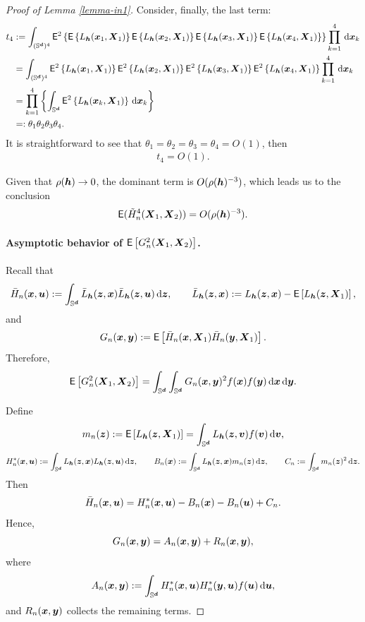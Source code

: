\documentclass[oneside,11pt]{article}
\begin{document}
\begin{proof}[Proof of Lemma \ref{lemma-in1}]
Consider, finally, the last term:
\begin{align*}
    t_4 &\defin \int_{(\Sr)^4} \mathsf{E}^2 \lrb{ \mathsf{E} \lrb{ L_{\bh} (\bx_1,\bX_1)} \mathsf{E} \lrb{ L_{\bh} (\bx_2,\bX_1)} \mathsf{E} \lrb{ L_{\bh} (\bx_3,\bX_1)} \mathsf{E} \lrb{ L_{\bh} (\bx_4,\bX_1)} }\prod_{k=1}^{4} \,\rd \bx_k \\
    &= \int_{(\Sr)^4} \mathsf{E}^2 \lrb{ L_{\bh} (\bx_1,\bX_1) } \mathsf{E}^2 \lrb{L_{\bh} (\bx_2,\bX_1) } \mathsf{E}^2 \lrb{ L_{\bh} (\bx_3,\bX_1)} \mathsf{E}^2 \lrb{ L_{\bh} (\bx_4,\bX_1)} \prod_{k=1}^{4} \,\rd \bx_k \\
    &= \prod_{k=1}^{4} \lrb{\int_{\Sr}  \mathsf{E}^2 \lrb{ L_{\bh} (\bx_k,\bX_1)} \,\rd \bx_k} \\
    & \indef \theta_1 \theta_2 \theta_3 \theta_4.
\end{align*}
It is straightforward to see that $\theta_1 =\theta_2= \theta_3= \theta_4=O(1)$, then
\begin{align*}
    t_4 = O(1).
\end{align*}

Given that $\rho (\bh) \to 0$, the dominant term is $O(\rho (\bh)^{-3})$, which leads us to the conclusion
\begin{align*}
    \mathsf{E} ( \tilde{H}_n^4(\bX_1, \bX_2)) = O(\rho (\bh)^{-3}).
\end{align*}

\paragraph{Asymptotic behavior of $\mathsf{E}\lrc{G_n^2(\bX_1,\bX_2)}$.}
Recall that
\[
\bar H_n(\bx,\bu) \defin \int_{\Sr} \bar L_{\bh}(\bz,\bx)\bar L_{\bh}(\bz,\bu)\,\rd \bz,
\qquad
\bar L_{\bh}(\bz,\bx) \defin L_{\bh}(\bz,\bx)-\mathsf{E}\lrc{L_{\bh}(\bz,\bX_1)},
\]
and
\[
G_n(\bx,\by) \defin \mathsf{E}\lrc{\bar H_n(\bx,\bX_1)\bar H_n(\by,\bX_1)}.
\]
Therefore,
\[
\mathsf{E}\lrc{G_n^2(\bX_1,\bX_2)}
=
\int_{\Sr}\int_{\Sr} G_n(\bx,\by)^2 f(\bx)f(\by)\,\rd \bx\,\rd \by.
\]

Define
\[
m_n(\bz) \defin \mathsf{E}\lrc{L_{\bh}(\bz,\bX_1)}
=
\int_{\Sr} L_{\bh}(\bz,\bv)f(\bv)\,\rd \bv,
\]
\[
H_n^\ast(\bx,\bu) \defin \int_{\Sr} L_{\bh}(\bz,\bx)L_{\bh}(\bz,\bu)\,\rd \bz,
\qquad
B_n(\bx) \defin \int_{\Sr} L_{\bh}(\bz,\bx)m_n(\bz)\,\rd \bz,
\qquad
C_n \defin \int_{\Sr} m_n(\bz)^2\,\rd \bz.
\]
Then
\[
\bar H_n(\bx,\bu)=H_n^\ast(\bx,\bu)-B_n(\bx)-B_n(\bu)+C_n.
\]
Hence,
\[
G_n(\bx,\by)=A_n(\bx,\by)+R_n(\bx,\by),
\]
where
\[
A_n(\bx,\by)\defin \int_{\Sr} H_n^\ast(\bx,\bu)H_n^\ast(\by,\bu)f(\bu)\,\rd \bu,
\]
and \(R_n(\bx,\by)\) collects the remaining terms.


\end{proof}
\end{document}
